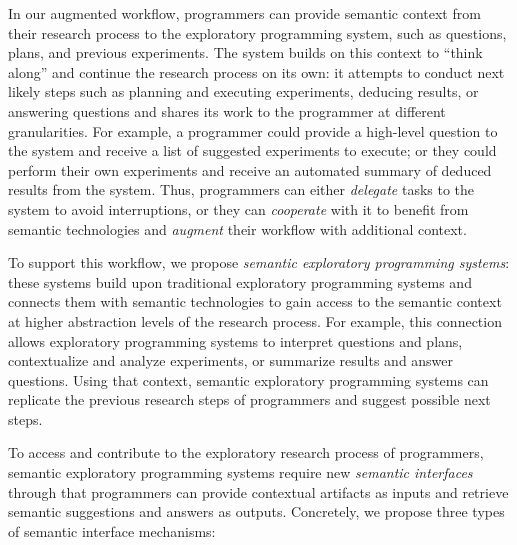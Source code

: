 In our augmented workflow, programmers can provide semantic context from their research process to the exploratory programming system, such as questions, plans, and previous experiments.
The system builds on this context to ``think along'' and continue the research process on its own:
it attempts to conduct next likely steps such as planning and executing experiments, deducing results, or answering questions and shares its work to the programmer at different granularities.
For example, a programmer could provide a high-level question to the system and receive a list of suggested experiments to execute; or they could perform their own experiments and receive an automated summary of deduced results from the system.
Thus, programmers can either \emph{delegate} tasks to the system to avoid interruptions, or they can \emph{cooperate} with it to benefit from semantic technologies and \emph{augment} their workflow with additional context.

To support this workflow, we propose \emph{semantic exploratory programming systems}:
these systems build upon traditional exploratory programming systems and connects them with semantic technologies to gain access to the semantic context at higher abstraction levels of the research process.
For example, this connection allows exploratory programming systems to interpret questions and plans, contextualize and analyze experiments, or summarize results and answer questions.
Using that context, semantic exploratory programming systems can replicate the previous research steps of programmers and suggest possible next steps.

To access and contribute to the exploratory research process of programmers, semantic exploratory programming systems require new \emph{semantic interfaces} through that programmers can provide contextual artifacts as inputs and retrieve semantic suggestions and answers as outputs.
Concretely, we propose three types of semantic interface mechanisms:

